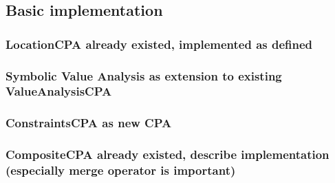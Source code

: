 \subsection{Basic implementation}
\subsubsection{LocationCPA already existed, implemented as defined}
\subsubsection{Symbolic Value Analysis as extension to existing ValueAnalysisCPA}
\subsubsection{ConstraintsCPA as new CPA}
\subsubsection{CompositeCPA already existed, describe implementation (especially merge operator is important)}
